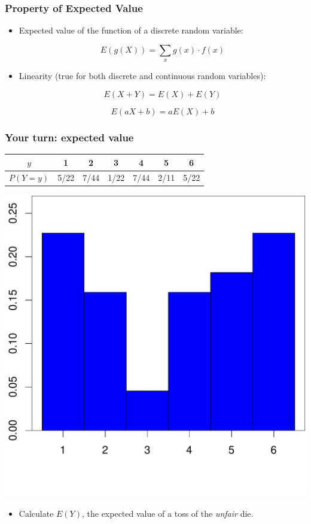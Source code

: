 \documentclass[handout]{beamer}\usepackage[]{graphicx}\usepackage[]{color}
\newenvironment{knitrout}{}{} %
\numberwithin{equation}{section}
\begin{document}
\begin{frame}
\frametitle{Property of Expected Value}
\begin{itemize}
\item
Expected value of the function of a discrete random variable:

\[E(g(X)) = \sum_{x} g(x) \cdot f(x)\]

\item
Linearity (true for both discrete and continuous random variables):

\[E(X + Y) = E(X) + E(Y)\]

\[E(a X + b) = aE(X) + b\]
\end{itemize}
\end{frame}




\begin{frame}
\frametitle{Your turn: expected value}

\begin{tabular}{ccccccc}
$y$ & 1 & 2 & 3 & 4 & 5 & 6 \\ \hline
$P(Y = y)$ & 5/22 & 7/44 & 1/22 & 7/44 & 2/11 & 5/22
\end{tabular} 

\begin{center}
\begin{knitrout}
\color{fgcolor}
\includegraphics[width=.6\textwidth,height=.6\textheight]{figure/unnamed-chunk-7-1} 

\end{knitrout}
\end{center}

\begin{itemize}
\item Calculate $E(Y)$, the expected value of a toss of the \emph{unfair} die.
\end{itemize}
\end{frame}
\end{document}
